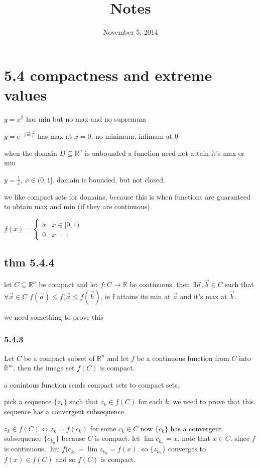 \documentclass[letterpaper]{article}
\begin{document}
\title{Notes}
\date{November 5, 2014}
\maketitle
\section*{5.4 compactness and extreme values}
$y=x^2$ has min but no max and no supremum

$y=e^{-||\vec{x}||^2}$ has max at $x=0$, no minimum, infimum at 0

when the domain $D\subseteq \mathbb{R}^n$ is unbounded a function need not attain it's max or min

$y=\frac{1}{x}$, $x\in(0,1]$. domain is bounded, but not closed.

we like compact sets for domains, because this is when functions are guaranteed to obtain max and min (if they are continuous).

$f(x)=\begin{cases}x&x\in[0,1)\\0&x=1\end{cases}$
\subsection*{thm 5.4.4}
let $C\subseteq \mathbb{R}^n$ be compact and let $f:C\to\mathbb{R}$ be continuous. then $\exists \vec{a},\vec{b}\in C$ such  that $\forall \vec{x}\in C$ $f(\vec{a})\le f(\vec{x}\le f(\vec{b})$. ie f attains its min at $\vec{a}$ and it's max at $\vec{b}$.

we need something to prove this
\subsubsection*{5.4.3}
Let $C$ be a compact subset of $\mathbb{R}^n$ and let $f$ be a continuous function from $C$ into $\mathbb{R}^m$. then the image set $f(C)$ is compact.

a conintous function sends compact sets to compact sets.

pick a sequence $\{z_k\}$ such that $z_k\in f(C)$ for each $k$. we need to prove that this sequence has a convergent subsequence.

$z_k\in f(C)\Leftrightarrow z_k=f(c_k)$ for some $c_k\in C$ now $\{c_k\}$ has a convergent subsequence $\{c_{k_n}\}$ because $C$ is compact. let $\lim c_{k_n}=x$, note that $x\in C$. since $f$ is continuous, $\lim f(c_{k_n}=\lim z_{k_n}=f(x)$. so $\{z_{k_n}\}$ converges to $f(x)\in f(C)$ and so $f(C)$ is compact.
\end{document}
